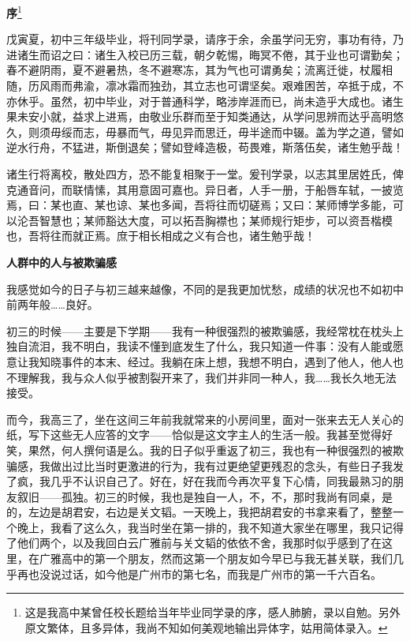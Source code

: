\documentclass{ctexbook}
\begin{document}
\newpage
\textbf{序}\footnote{\normalsize 这是我高中某曾任校长题给当年毕业同学录的序，感人肺腑，录以自勉。另外原文繁体，且多异体，我尚不知如何美观地输出异体字，姑用简体录入。}

    戊寅夏，初中三年级毕业，将刊同学录，请序于余，余虽学问无穷，事功有待，乃进诸生而诏之曰：诸生入校已历三载，朝夕乾惕，晦冥不倦，其于业也可谓勤矣；春不避阴雨，夏不避暑热，冬不避寒冻，其为气也可谓勇矣；流离迁徙，杖履相随，历风雨而弗渝，凛冰霜而独劲，其立志也可谓坚矣。艰难困苦，卒抵于成，不亦休乎。虽然，初中毕业，对于普通科学，略涉岸涯而已，尚未造乎大成也。诸生果未安小就，益求上进焉，由敬业乐群而至于知类通达，从学问思辨而达乎高明悠久，则须毋绥而志，毋暴而气，毋见异而思迁，毋半途而中辍。盖为学之道，譬如逆水行舟，不猛进，斯倒退矣；譬如登峰造极，苟畏难，斯落伍矣，诸生勉乎哉！
    
    诸生行将离校，散处四方，恐不能复相聚于一堂。爰刊学录，以志其里居姓氏，俾克通音问，而联情愫，其用意固可嘉也。异日者，人手一册，于船唇车轼，一披览焉，曰：某也直、某也谅、某也多闻，吾将往而切磋焉；又曰：某师博学多能，可以沦吾智慧也；某师豁达大度，可以拓吾胸襟也；某师规行矩步，可以资吾楷模也，吾将往而就正焉。庶于相长相成之义有合也，诸生勉乎哉！

\newpage
\textbf{人群中的人与被欺骗感}


\mbox


    我感觉如今的日子与初三越来越像，不同的是我更加忧愁，成绩的状况也不如初中前两年般……良好。

    初三的时候——主要是下学期——我有一种很强烈的被欺骗感，我经常枕在枕头上独自流泪，我不明白，我读不懂到底发生了什么，我只知道一件事：没有人能或愿意让我知晓事件的本末、经过。我躺在床上想，我想不明白，遇到了他人，他人也不理解我，我与众人似乎被割裂开来了，我们并非同一种人，我……我长久地无法接受。

    而今，我高三了，坐在这间三年前我就常来的小房间里，面对一张来去无人关心的纸，写下这些无人应答的文字——恰似是这文字主人的生活一般。我甚至觉得好笑，果然，何人撰何语是么。我的日子似乎重返了初三，我也有一种很强烈的被欺骗感，我做出过比当时更激进的行为，我有过更绝望更残忍的念头，有些日子我发了疯，我几乎不认识自己了。好在，好在我而今再次平复下心情，同我最熟习的朋友叙旧——孤独。初三的时候，我也是独自一人，不，不，那时我尚有同桌，是的，左边是胡君安，右边是关文韬。一天晚上，我把胡君安的书拿来看了，整整一个晚上，我看了这么久，我当时坐在第一排的，我不知道大家坐在哪里，我只记得了他们两个，以及我回白云广雅前与关文韬的依依不舍，我那时似乎感到了在这里，在广雅高中的第一个朋友，然而这第一个朋友如今早已与我无甚关联，我们几乎再也没说过话，如今他是广州市的第七名，而我是广州市的第一千六百名。
\end{document}
